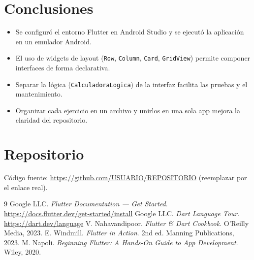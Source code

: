 \documentclass[12pt,a4paper]{article}
\begin{document}
\section{Conclusiones}
\begin{itemize}
  \item Se configuró el entorno Flutter en Android Studio y se ejecutó la aplicación en un emulador Android.
  \item El uso de widgets de layout (\texttt{Row}, \texttt{Column}, \texttt{Card}, \texttt{GridView}) permite componer interfaces de forma declarativa.
  \item Separar la lógica (\texttt{CalculadoraLogica}) de la interfaz facilita las pruebas y el mantenimiento.
  \item Organizar cada ejercicio en un archivo y unirlos en una sola app mejora la claridad del repositorio.
\end{itemize}

\section{Repositorio}
Código fuente: \url{https://github.com/USUARIO/REPOSITORIO} \quad (reemplazar por el enlace real).

\begin{thebibliography}{9}
 Google LLC. \textit{Flutter Documentation --- Get Started}. \url{https://docs.flutter.dev/get-started/install}
 Google LLC. \textit{Dart Language Tour}. \url{https://dart.dev/language}
 V. Nahavandipoor. \textit{Flutter \& Dart Cookbook}. O'Reilly Media, 2023.
 E. Windmill. \textit{Flutter in Action}. 2nd ed. Manning Publications, 2023.
 M. Napoli. \textit{Beginning Flutter: A Hands-On Guide to App Development}. Wiley, 2020.
\end{thebibliography}
\end{document}
